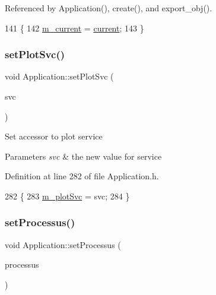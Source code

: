Referenced by Application(), create(), and export\+\_\+obj().


\begin{DoxyCode}
141                                        \{
142     \hyperlink{classApplication_ab0fd877a3c66c41b22109863e1719ccd}{m\_current} = \hyperlink{classApplication_af25c880ff1e95d863ed058396754a76e}{current};
143   \}
\end{DoxyCode}
\mbox{\label{classApplication_ac11402510105adf9a9ccf3daa25ea7d4}} 
\subsubsection{\texorpdfstring{set\+Plot\+Svc()}{setPlotSvc()}}
{\footnotesize\ttfamily void Application\+::set\+Plot\+Svc (\begin{DoxyParamCaption}\item[{\hyperlink{Application_8h_abaa10d33ca2837dfcf8ba9bff40cdbb6}{Plot\+Svc}}]{svc }\end{DoxyParamCaption})\hspace{0.3cm}{\ttfamily [inline]}}

Set accessor to plot service 
\begin{DoxyParams}{Parameters}
{\em svc} & the new value for service \\
\hline
\end{DoxyParams}


Definition at line 282 of file Application.\+h.


\begin{DoxyCode}
282                                  \{
283     \hyperlink{classApplication_a30d5600ea5e4f36b14f25f903ee3256e}{m\_plotSvc} = svc;
284   \}
\end{DoxyCode}
\mbox{\label{classApplication_a8ed8a66653bb6e665e05a735519c5d5b}} 
\subsubsection{\texorpdfstring{set\+Processus()}{setProcessus()}}
{\footnotesize\ttfamily void Application\+::set\+Processus (\begin{DoxyParamCaption}\item[{\hyperlink{classProcessus}{Processus} $\ast$}]{processus }\end{DoxyParamCaption})\hspace{0.3cm}{\ttfamily [inline]}}

